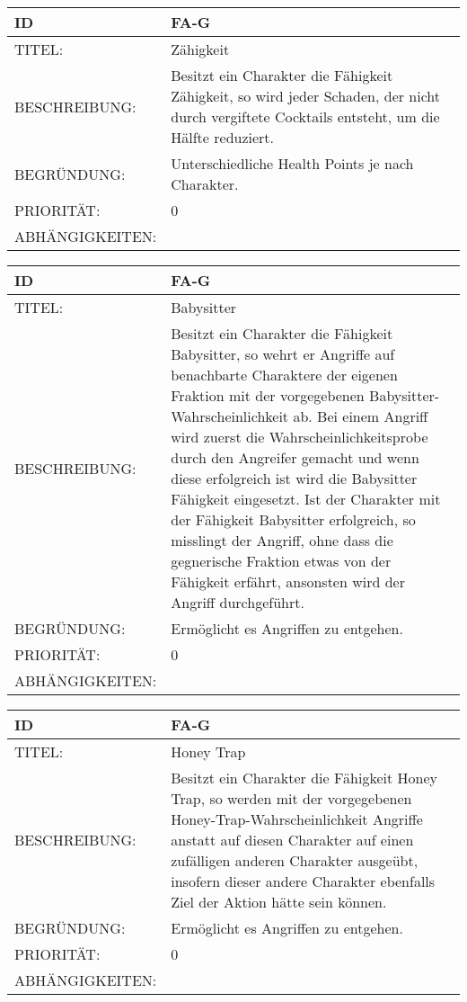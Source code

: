 \begin{tabularx}{16cm}{l|X}
	{table}\label{Zaehigkeit}
	\textbf{ID} & \textbf{FA-G \arabic{table}} \\
	\hline
	TITEL: & Zähigkeit \\
	\hline
	BESCHREIBUNG: & Besitzt ein Charakter die Fähigkeit Zähigkeit, so wird jeder Schaden, der nicht durch vergiftete Cocktails entsteht, um die Hälfte reduziert.\\
	\hline
	BEGRÜNDUNG: & Unterschiedliche Health Points je nach Charakter.\\
	\hline
	PRIORITÄT: & 0\\
	\hline
	ABHÄNGIGKEITEN: & \\
\end{tabularx}

\begin{tabularx}{16cm}{l|X}
	{table}\label{Babysitter}
	\textbf{ID} & \textbf{FA-G \arabic{table}} \\
	\hline
	TITEL: & Babysitter \\
	\hline
	BESCHREIBUNG: & Besitzt ein Charakter die Fähigkeit Babysitter, so wehrt er Angriffe auf benachbarte Charaktere der eigenen Fraktion mit der vorgegebenen Babysitter-Wahrscheinlichkeit ab. Bei einem Angriff wird zuerst die Wahrscheinlichkeitsprobe durch den Angreifer gemacht und wenn diese erfolgreich ist wird die Babysitter Fähigkeit eingesetzt. Ist der Charakter mit der Fähigkeit Babysitter erfolgreich, so misslingt der Angriff, ohne dass die gegnerische Fraktion etwas von der Fähigkeit erfährt, ansonsten wird der Angriff durchgeführt.\\
	\hline
	BEGRÜNDUNG: & Ermöglicht es Angriffen zu entgehen.\\
	\hline
	PRIORITÄT: & 0\\
	\hline
	ABHÄNGIGKEITEN: & \\
\end{tabularx}

\begin{tabularx}{16cm}{l|X}
	{table}\label{Honey Trap}
	\textbf{ID} & \textbf{FA-G \arabic{table}} \\
	\hline
	TITEL: & Honey Trap \\
	\hline
	BESCHREIBUNG: & Besitzt ein Charakter die Fähigkeit Honey Trap, so werden mit der vorgegebenen Honey-Trap-Wahrscheinlichkeit Angriffe anstatt auf diesen Charakter auf einen zufälligen anderen Charakter ausgeübt, insofern dieser andere Charakter ebenfalls Ziel der Aktion hätte sein können.\\
	\hline
	BEGRÜNDUNG: & Ermöglicht es Angriffen zu entgehen.\\
	\hline
	PRIORITÄT: & 0\\
	\hline
	ABHÄNGIGKEITEN: & \\
\end{tabularx}

